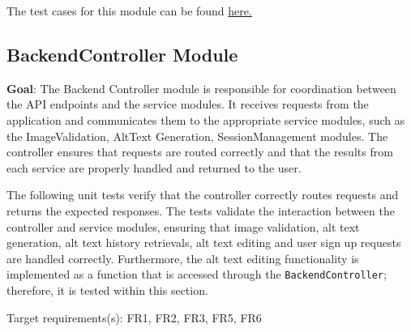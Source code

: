 \documentclass[12pt, titlepage]{article}
\begin{document}
The test cases for this module can be found \href{https://github.com/4G06-CAPSTONE-2025/Reading4All/blob/main/backend/tests/test_image_validation.py}{here.}

\subsection{BackendController Module}
\textbf{Goal}:
The Backend Controller module is responsible for coordination between the API endpoints and the service modules. 
It receives requests from the application and communicates them to the appropriate service modules, such as the ImageValidation, 
AltText Generation, SessionManagement modules. The controller ensures that requests are routed correctly and 
that the results from each service are properly handled and returned to the user. 

The following unit tests verify that the controller correctly routes requests and returns the expected responses. 
The tests validate the interaction between the controller and service modules, ensuring that image validation, 
alt text generation, alt text history retrievals, alt text editing and user sign up requests are handled correctly.
Furthermore, the alt text editing functionality is implemented as a function that is accessed through the \texttt{BackendController}; 
therefore, it is tested within this section.

Target requirements(s): FR1, FR2, FR3, FR5, FR6
\end{document}
